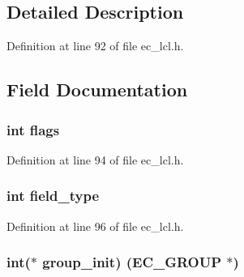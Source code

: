 \subsection{Detailed Description}


Definition at line 92 of file ec\+\_\+lcl.\+h.



\subsection{Field Documentation}
\subsubsection[{\texorpdfstring{flags}{flags}}]{\setlength{\rightskip}{0pt plus 5cm}int flags}\hypertarget{structec__method__st_ac8bf36fe0577cba66bccda3a6f7e80a4}{}\label{structec__method__st_ac8bf36fe0577cba66bccda3a6f7e80a4}


Definition at line 94 of file ec\+\_\+lcl.\+h.

\subsubsection[{\texorpdfstring{field\+\_\+type}{field_type}}]{\setlength{\rightskip}{0pt plus 5cm}int field\+\_\+type}\hypertarget{structec__method__st_a3337f4880bc9779ef468d0c0cbdf8e3b}{}\label{structec__method__st_a3337f4880bc9779ef468d0c0cbdf8e3b}


Definition at line 96 of file ec\+\_\+lcl.\+h.

\subsubsection[{\texorpdfstring{group\+\_\+init}{group_init}}]{\setlength{\rightskip}{0pt plus 5cm}int($\ast$ group\+\_\+init) ({\bf E\+C\+\_\+\+G\+R\+O\+UP} $\ast$)}\hypertarget{structec__method__st_a60946752e9d89a6161e8bc95b31adaac}{}\label{structec__method__st_a60946752e9d89a6161e8bc95b31adaac}


